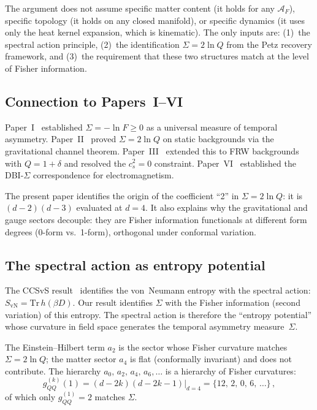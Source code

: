 \documentclass[prd,twocolumn,superscriptaddress,longbibliography]{revtex4-2}
\newcommand{\Tr}{\mathrm{Tr}}
\newcommand{\SvN}{S_{\mathrm{vN}}}
\newcommand{\AF}{\mathcal{A}_F}
\begin{document}
The argument does not assume specific matter content (it holds
for any $\AF$), specific topology (it holds on any
closed manifold), or specific dynamics (it uses only
the heat kernel expansion, which is kinematic).
The only inputs are: (1)~the spectral action principle,
(2)~the identification $\Sigma = 2\ln Q$ from the Petz
recovery framework, and (3)~the requirement that these
two structures match at the level of Fisher information.

\subsection{Connection to Papers~I--VI}

Paper~I~\cite{PaperI} established $\Sigma = -\ln F \geq 0$
as a universal measure of temporal asymmetry.
Paper~II~\cite{PaperII} proved $\Sigma = 2\ln Q$ on static
backgrounds via the gravitational channel theorem.
Paper~III~\cite{PaperIII} extended this to FRW backgrounds
with $Q = 1+\delta$ and resolved the $c_s^2 = 0$ constraint.
Paper~VI~\cite{PaperVI} established the DBI-$\Sigma$
correspondence for electromagnetism.

The present paper identifies the origin of the coefficient
``2'' in $\Sigma = 2\ln Q$: it is $(d-2)(d-3)$ evaluated at
$d=4$.
It also explains why the gravitational and gauge sectors
decouple: they are Fisher information functionals at different
form degrees (0-form vs.\ 1-form), orthogonal under conformal
variation.

\subsection{The spectral action as entropy potential}

The CCSvS result~\cite{CCSvS2020} identifies the von~Neumann
entropy with the spectral action: $\SvN = \Tr\,h(\beta D)$.
Our result identifies $\Sigma$ with the Fisher information
(second variation) of this entropy.
The spectral action is therefore the ``entropy potential''
whose curvature in field space generates the temporal
asymmetry measure~$\Sigma$.

The Einstein--Hilbert term $a_2$ is the sector whose Fisher
curvature matches $\Sigma = 2\ln Q$; the matter sector $a_4$
is flat (conformally invariant) and does not contribute.
The hierarchy $a_0,\,a_2,\,a_4,\,a_6,\ldots$ is a hierarchy
of Fisher curvatures:
\begin{equation}
  g_{QQ}^{(k)}(1) = (d-2k)(d-2k-1)\big|_{d=4}
  = \{12,\, 2,\, 0,\, 6,\,\ldots\}\,,
\end{equation}
of which only $g_{QQ}^{(1)}=2$ matches $\Sigma$.
\end{document}
